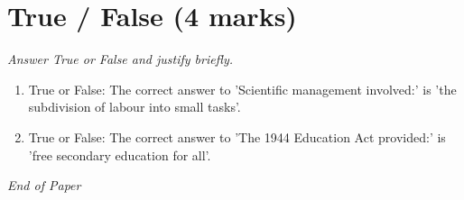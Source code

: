 \documentclass[12pt]{article}
\begin{document}
\section*{True / False (4 marks)}
\textit{Answer True or False and justify briefly.}
\begin{enumerate}[label=\arabic*.]
\item True or False: The correct answer to 'Scientific management involved:' is 'the subdivision of labour into small tasks'.
\item True or False: The correct answer to 'The 1944 Education Act provided:' is 'free secondary education for all'.
\end{enumerate}

\vfill
\noindent\textit{End of Paper}
\end{document}
